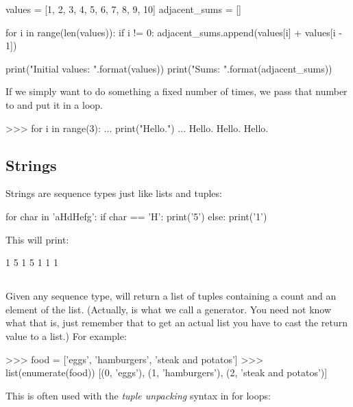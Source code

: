 \documentclass[11pt]{cselabheader}
\begin{document}
\begin{python3code}
values = [1, 2, 3, 4, 5, 6, 7, 8, 9, 10]
adjacent_sums = []

for i in range(len(values)):
    if i != 0:
        adjacent_sums.append(values[i] + values[i - 1])

print("Initial values: {}".format(values))
print("Sums: {}".format(adjacent_sums))
\end{python3code}

If we simply want to do something a fixed number of times, we pass that number
to  and put it in a loop.

\begin{pyconcode}
>>> for i in range(3):
...     print("Hello.")
...
Hello.
Hello.
Hello.
\end{pyconcode}

\subsection{Strings}

Strings are sequence types just like lists and tuples:

\begin{python3code}
for char in 'aHdHefg':
    if char == 'H':
        print('5')
    else:
        print('1')
\end{python3code}

This will print:

\begin{verbatimcode}
1
5
1
5
1
1
1
\end{verbatimcode}

\subsection{\protect{}}

Given any sequence type,  will return a list of tuples
containing a count and an element of the list. (Actually,
 is what we call a generator. You need not know what
that is, just remember that to get an actual list you have to cast the return
value to a list.) For example:

\begin{pyconcode}
>>> food = ['eggs', 'hamburgers', 'steak and potatos']
>>> list(enumerate(food))
[(0, 'eggs'), (1, 'hamburgers'), (2, 'steak and potatos')]
\end{pyconcode}

This is often used with the \emph{tuple unpacking} syntax in for loops:
\end{document}
